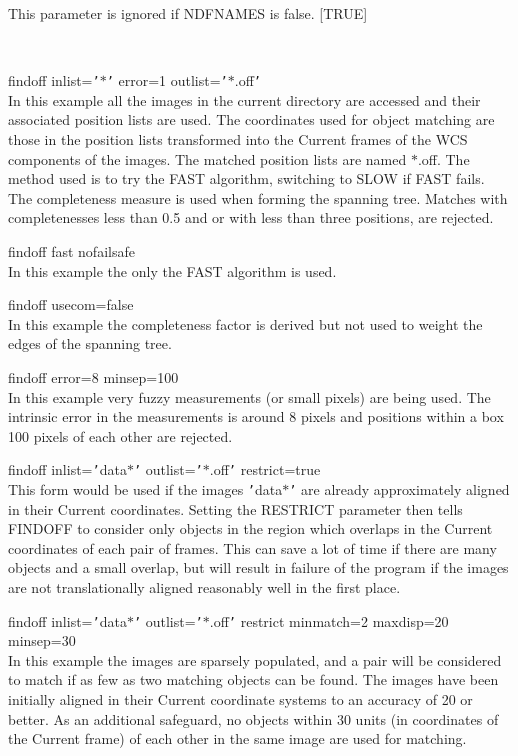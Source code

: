 \documentclass[twoside,11pt]{article}
\renewcommand{\_}{\texttt{\symbol{95}}}
\newcommand{\qs}[1]{{\tt '}#1{\tt '}}
\newcommand{\sstexamples}[1]{
   \item[Examples:] \mbox{} \\
   \vspace{-3.5ex}
   \begin{description}
      #1
   \end{description}
}
\newcommand{\sstexamplesubsection}[2]{\sloppy \item{\ssttt #1} \mbox{} \\ #2 }
\newcommand{\sstnotes}[1]{\item[Notes:] \mbox{} \\[1.3ex] #1}
\newcommand{\sstitemlist}[1]{
  \mbox{} \\
  \vspace{-3.5ex}
  \begin{itemize}
     #1
  \end{itemize}
}
\newcommand{\sstexamples}[1]{
      \item[Examples:] \\
      \begin{description}
         #1
      \end{description}
      \\
   }
\newcommand{\sstexamplesubsection}[2]{\item[{\ssttt #1}] #2}
\newcommand{\sstnotes}[1]{\item[Notes:] #1 }
\newcommand{\sstitemlist}[1]{
      \begin{itemize}
         #1
      \end{itemize}
      \\
   }
\begin{document}
{{{         This parameter is ignored if NDFNAMES is false.
         [TRUE]
      }
   }
   \sstexamples{
      \sstexamplesubsection{
         findoff inlist=\qs{$*$} error=1 outlist=\qs{$*$.off}
      } {
         In this example all the images in the current directory are
         accessed and their associated position lists are used.
         The coordinates used for object matching are those in the
         position lists transformed into the Current frames of the
         WCS components of the images.  The matched position lists are
         named $*$.off.  The method used is to try the FAST algorithm,
         switching to SLOW if FAST fails. The completeness measure
         is used when forming the spanning tree.  Matches with
         completenesses less than 0.5 and or with less than three
         positions, are rejected.
      }
      \sstexamplesubsection{
         findoff fast nofailsafe
      } {
         In this example the only the FAST algorithm is used.
      }
      \sstexamplesubsection{
         findoff usecom=false
      } {
         In this example the completeness factor is derived but not used
         to weight the edges of the spanning tree.
      }
      \sstexamplesubsection{
         findoff error=8 minsep=100
      }{
         In this example very fuzzy measurements (or small pixels) are
         being used.  The intrinsic error in the measurements is around
         8 pixels and positions within a box 100 pixels of each other
         are rejected.
      }
      \sstexamplesubsection{
         findoff inlist={\tt '}data$*${\tt '} outlist={\tt '}$*$.off{\tt '} restrict=true
      }{
         This form would be used if the images {\tt '}data$*${\tt '} are already
         approximately aligned in their Current coordinates. Setting the
         RESTRICT parameter then tells FINDOFF to consider only objects
         in the region which overlaps in the Current coordinates of
         each pair of frames. This can save a lot of time if there
         are many objects and a small overlap, but will result in
         failure of the program if the images are not translationally
         aligned reasonably well in the first place.
      }
      \sstexamplesubsection{
         findoff inlist={\tt '}data$*${\tt '} outlist={\tt '}$*$.off{\tt '} restrict minmatch=2
              maxdisp=20 minsep=30
      }{
         In this example the images are sparsely populated, and a pair
         will be considered to match if as few as two matching objects
         can be found.  The images have been initially aligned in their
         Current coordinate systems to an accuracy of 20 or better.  As
         an additional safeguard, no objects within 30 units (in
         coordinates of the Current frame) of each other in the same image
         are used for matching.
      }
   }
   \sstnotes{
      \sstitemlist{

}}}
\end{document}
